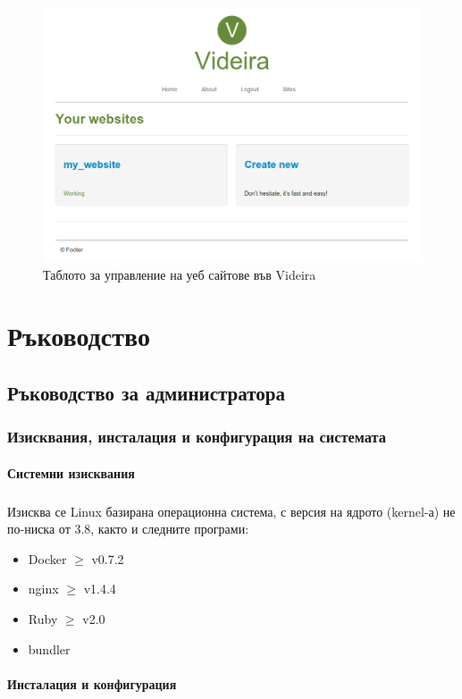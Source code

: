 \documentclass[pdftex,14pt,a4paper]{extreport}
\begin{document}
\begin{figure}[h]
  \centering
  \includegraphics [scale=0.4]{./videira_tenants}
  \caption {Таблото за управление на уеб сайтове във Videira}
\end{figure}
\chapter {Ръководство}
\section {Ръководство за администратора}
\subsection {Изисквания, инсталация и конфигурация на системата}
\subsubsection {Системни изисквания}
\paragraph {}
Изисква се Linux базирана операционна система, с версия на ядрото (kernel-а) не по-ниска от 3.8, както и следните програми:
\begin{itemize}
  \item Docker  $\ge$ v0.7.2
  \item nginx  $\ge$ v1.4.4
  \item Ruby   $\ge$ v2.0
  \item bundler
\end{itemize}
\subsubsection {Инсталация и конфигурация}
\end{document}
